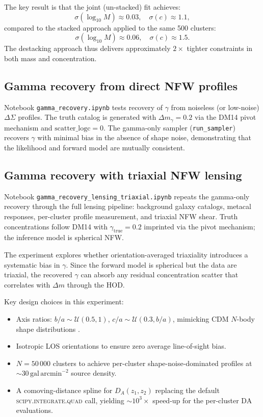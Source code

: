 \documentclass[12pt,a4paper]{article}
\begin{document}
The key result is that the joint (un-stacked) fit achieves:
\begin{equation}
  \sigma(\log_{10}M) \approx 0.03,\quad \sigma(c) \approx 1.1,
\end{equation}
compared to the stacked approach applied to the same 500 clusters:
\begin{equation}
  \sigma(\log_{10}M) \approx 0.06,\quad \sigma(c) \approx 1.5.
\end{equation}
The destacking approach thus delivers approximately $2\times$ tighter
constraints in both mass and concentration.

\subsection{Gamma recovery from direct NFW profiles}

Notebook \texttt{gamma\_recovery.ipynb} tests recovery of $\gamma$ from noiseless
(or low-noise) $\Delta\Sigma$ profiles.  The truth catalog is generated with
$\Delta m_\gamma = 0.2$ via the DM14 pivot mechanism and $\mathrm{scatter\_logc}=0$.
The gamma-only sampler (\texttt{run\_sampler}) recovers $\gamma$ with minimal bias
in the absence of shape noise, demonstrating that the likelihood and forward model
are mutually consistent.

\subsection{Gamma recovery with triaxial NFW lensing}

Notebook \texttt{gamma\_recovery\_lensing\_triaxial.ipynb} repeats the gamma-only
recovery through the full lensing pipeline: background galaxy catalogs, metacal
responses, per-cluster profile measurement, and triaxial NFW shear.
Truth concentrations follow DM14 with $\gamma_\mathrm{true}=0.2$ imprinted via the
pivot mechanism; the inference model is spherical NFW.

The experiment explores whether orientation-averaged triaxiality introduces a
systematic bias in $\gamma$.  Since the forward model is spherical but the data
are triaxial, the recovered $\gamma$ can absorb any residual concentration scatter
that correlates with $\Delta m$ through the HOD.

Key design choices in this experiment:
\begin{itemize}
  \item Axis ratios: $b/a\sim\mathcal{U}(0.5,1)$, $c/a\sim\mathcal{U}(0.3,b/a)$, mimicking
    CDM $N$-body shape distributions \citep{Allgood2006,Schneider2012}.
  \item Isotropic LOS orientations to ensure zero average line-of-sight bias.
  \item $N=50\,000$ clusters to achieve per-cluster shape-noise-dominated profiles
    at $\sim\!30\,\mathrm{gal\,arcmin}^{-2}$ source density.
  \item A comoving-distance spline for $D_A(z_1,z_2)$ replacing the default
    \textsc{scipy.integrate.quad} call, yielding $\sim\!10^3\times$ speed-up for
    the per-cluster DA evaluations.
\end{itemize}
\end{document}
